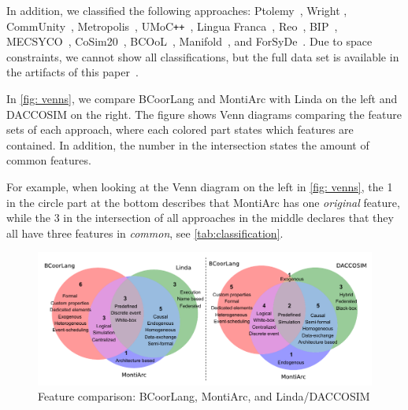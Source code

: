 \documentclass[runningheads]{llncs}
\begin{document}
In addition, we classified the following approaches: Ptolemy~\cite{ekerTamingHeterogeneityPtolemy2003,ptolemaeusSystemDesignModeling2014}, Wright \cite{allenFormalBasisArchitectural1997,allenFormalApproachSoftware1997}, CommUnity~\cite{fiadeiroSemanticsArchitecturalConnectors1997,oliveiraCommUnityWorkbench2007}, Metropolis~\cite{balarinMetropolisIntegratedElectronic2003}, UMoC\texttt{++}~\cite{mathaikuttyUMoCBasedMultiMoC2006}, Lingua Franca~\cite{lohstrohReactorsDeterministicModel2020,lohstrohLinguaFrancaDeterministic2021}, Reo~\cite{arbabReoChannelbasedCoordination2004}, BIP~\cite{bliudzeAlgebraConnectorsStructuring2008,basuRigorousComponentBasedSystem2011},
MECSYCO~\cite{camusCosimulationCyberphysicalSystems2018,camusHybridCosimulationFMUs2016},
CoSim20~\cite{liboniComplexSystemsCosimulation2021},
BCOoL~\cite{varalarsenBehavioralCoordinationOperator2015,varalarsenBCOolBehavioralCoordination2016},
Manifold~\cite{arbabOverviewManifoldIts1993,papadopoulosModellingActivitiesInformation1998}, and ForSyDe~\cite{sanderSystemModelingTransformational2004,sanderForSyDeSystemDesign2016}.
Due to space constraints, we cannot show all classifications, but the full data set is available in the artifacts of this paper~\cite{timkrauterArtifactsCoordination2024}.

In \autoref{fig: venns}, we compare BCoorLang and MontiArc with Linda on the left and DACCOSIM on the right.
The figure shows Venn diagrams comparing the feature sets of each approach, where each colored part states which features are contained.
In addition, the number in the intersection states the amount of common features.

For example, when looking at the Venn diagram on the left in \autoref{fig: venns}, the \textsf{1} in the circle part at the bottom describes that MontiArc has one \textit{original} feature, while the \textsf{3} in the intersection of all approaches in the middle declares that they all have three features in \textit{common}, see \autoref{tab:classification}.

\begin{figure}[ht]
	\centering
	\includegraphics[width=1\textwidth]{images/venns}
	\caption{Feature comparison: BCoorLang, MontiArc, and Linda/DACCOSIM}
	\label{fig: venns}
\end{figure}
\end{document}
